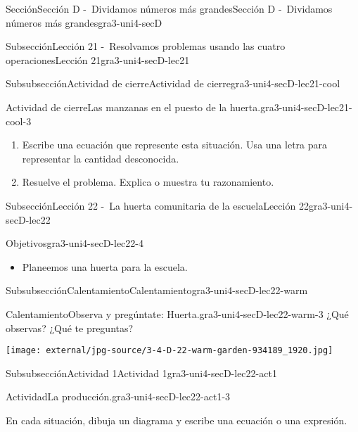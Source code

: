 \documentclass[twoside,10pt,]{article}
\begin{document}
\begin{sectionptx}{Sección}{Sección D -~Dividamos números más grandes}{}{Sección D -~Dividamos números más grandes}{}{}{gra3-uni4-secD}
\begin{subsectionptx}{Subsección}{Lección 21 -~Resolvamos problemas usando las cuatro operaciones}{}{Lección 21}{}{}{gra3-uni4-secD-lec21}
\begin{subsubsectionptx}{Subsubsección}{Actividad de cierre}{}{Actividad de cierre}{}{}{gra3-uni4-secD-lec21-cool}
\begin{project}{Actividad de cierre}{Las manzanas en el puesto de la huerta.}{gra3-uni4-secD-lec21-cool-3}
\begin{enumerate}
\item{}Escribe una ecuación que represente esta situación. Usa una letra para representar la cantidad desconocida.%
\item{}Resuelve el problema. Explica o muestra tu razonamiento.%
\end{enumerate}
\end{project}%
\end{subsubsectionptx}
\end{subsectionptx}
%
%
\typeout{************************************************}
\typeout{************************************************}
%
\begin{subsectionptx}{Subsección}{Lección 22 -~La huerta comunitaria de la escuela}{}{Lección 22}{}{}{gra3-uni4-secD-lec22}
\begin{objectives}{Objetivos}{gra3-uni4-secD-lec22-4}
%
\begin{itemize}[label=\textbullet]
\item{}Planeemos una huerta para la escuela.%
\end{itemize}
\end{objectives}
%
%
\typeout{************************************************}
\typeout{************************************************}
%
\begin{subsubsectionptx}{Subsubsección}{Calentamiento}{}{Calentamiento}{}{}{gra3-uni4-secD-lec22-warm}
\begin{exploration}{Calentamiento}{Observa y pregúntate: Huerta.}{gra3-uni4-secD-lec22-warm-3}%
¿Qué observas? ¿Qué te preguntas?%
\begin{image}{0.125}{0.75}{0.125}{}%
\texttt{[image: external/jpg-source/3-4-D-22-warm-garden-934189\_1920.jpg]}
\end{image}%
\end{exploration}%
\end{subsubsectionptx}
%
%
\typeout{************************************************}
\typeout{************************************************}
%
\begin{subsubsectionptx}{Subsubsección}{Actividad 1}{}{Actividad 1}{}{}{gra3-uni4-secD-lec22-act1}
\begin{activity}{Actividad}{La producción.}{gra3-uni4-secD-lec22-act1-3}%
\begin{sidebyside}{2}{0}{0}{0}%
\begin{sbspanel}{0.5}%
En cada situación, dibuja un diagrama y escribe una ecuación o una expresión.%

\end{sbspanel}
\end{sidebyside}
\end{activity}
\end{subsubsectionptx}
\end{subsectionptx}
\end{sectionptx}
\end{document}
